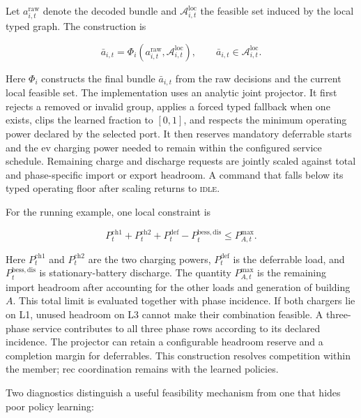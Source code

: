 Let $a^{\mathrm{raw}}_{i,t}$ denote the decoded bundle and $\mathcal{A}^{\mathrm{loc}}_{i,t}$ the feasible set induced by the local typed graph. The construction is

\begin{equation}
\bar{a}_{i,t}
=
\Phi_i
\left(
 a^{\mathrm{raw}}_{i,t},
 \mathcal{A}^{\mathrm{loc}}_{i,t}
\right),
\qquad
\bar{a}_{i,t}\in\mathcal{A}^{\mathrm{loc}}_{i,t}.
\label{eq:local-bundle-construction}
\end{equation}

Here $\Phi_i$ constructs the final bundle $\bar a_{i,t}$ from the raw decisions and the current local feasible set. The implementation uses an analytic joint projector. It first rejects a removed or invalid group, applies a forced typed fallback when one exists, clips the learned fraction to $[0,1]$, and respects the minimum operating power declared by the selected port. It then reserves mandatory deferrable starts and the \gls{ev} charging power needed to remain within the configured service schedule. Remaining charge and discharge requests are jointly scaled against total and phase-specific import or export headroom. A command that falls below its typed operating floor after scaling returns to \textsc{idle}.

For the running example, one local constraint is

\begin{equation}
P^{\mathrm{ch1}}_t
+
P^{\mathrm{ch2}}_t
+
P^{\mathrm{def}}_t
-
P^{\mathrm{bess,dis}}_t
\leq
P^{\max}_{A,t}.
\label{eq:running-local-constraint}
\end{equation}

Here $P^{\mathrm{ch1}}_t$ and $P^{\mathrm{ch2}}_t$ are the two charging powers, $P^{\mathrm{def}}_t$ is the deferrable load, and $P^{\mathrm{bess,dis}}_t$ is stationary-battery discharge. The quantity $P^{\max}_{A,t}$ is the remaining import headroom after accounting for the other loads and generation of building $A$. This total limit is evaluated together with phase incidence. If both chargers lie on L1, unused headroom on L3 cannot make their combination feasible. A three-phase service contributes to all three phase rows according to its declared incidence. The projector can retain a configurable headroom reserve and a completion margin for deferrables. This construction resolves competition within the member; \gls{rec} coordination remains with the learned policies.

Two diagnostics distinguish a useful feasibility mechanism from one that hides poor policy learning:

